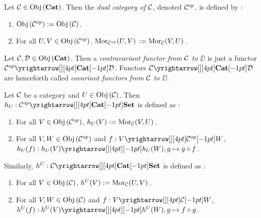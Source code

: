 \begin{dfn}
  
  Let $\mathcal{C} \in \mathrm{Obj}\left(\mathbf{Cat}\right)$. 
  Then the \emph{dual category of $\mathcal{C}$}, denoted $\mathcal{C}^{op}$,
  is defined by : 
  \begin{enumerate}
    \item $\mathrm{Obj}\left(\mathcal{C}^{op}\right) := \mathrm{Obj}\left(\mathcal{C}\right)$. 
    \item For all $U, V \in \mathrm{Obj}\left(\mathcal{C}^{op}\right)$,
    $\mathrm{Mor}_{\mathcal{C}^{op}}(U, V)\, := \mathrm{Mor}_{\mathcal{C}}(V, U)\,$.
  \end{enumerate}
\end{dfn}

\begin{dfn}
  
  Let $\mathcal{C}, \mathcal{D} \in \mathrm{Obj}\left(\mathbf{Cat}\right)$. 
  Then a \emph{contravariant functor from $\mathcal{C}$ to $\DD$} is 
  just a functor $\map{\CC\op}{\DD}{\CAT}{}$. 
  Functors $\map{\CC}{\DD}{\CAT}{}$ are henceforth called 
  \emph{covariant functors from $\mathcal{C}$ to $\DD$}. 
\end{dfn}

%   

\begin{dfn}
  
  Let $\mathcal{C}$ be a category and $U \in \mathrm{Obj}\left(\mathcal{C}\right)$. 
  Then $h_U : \map{\CC\op}{\SET}{\CAT}{}$ is defined as : 
  \begin{enumerate}
    \item For all $V \in \mathrm{Obj}\left(\mathcal{C}^{op}\right)$, 
    $h_U(V) := \mathrm{Mor}_{\mathcal{C}}(V, U)\,$. 
    \item For all $V, W \in \mathrm{Obj}\left(\mathcal{C}^{op}\right)$ and $f : \map{V}{W}{\CC\op}{}$, 
    $h_U(f) : \map{h_U(V)}{h_U(W)}{}{}, g \mapsto g \circ f$. 
  \end{enumerate}
  Similarly, $h^U : \map{\CC}{\SET}{\CAT}{}$ is defined as : 
  \begin{enumerate}
    \item For all $V \in \mathrm{Obj}\left(\mathcal{C}\right)$, 
    $h^U(V) := \mathrm{Mor}_{\mathcal{C}}(U, V)\,$. 
    \item For all $V, W \in \mathrm{Obj}\left(\mathcal{C}\right)$ and $f : \map{V}{W}{\CC}{}$, 
    $h^U(f) : \map{h^U(V)}{h^U(W)}{}{}, 
    g \mapsto f \circ g$. 
  \end{enumerate}
\end{dfn}

